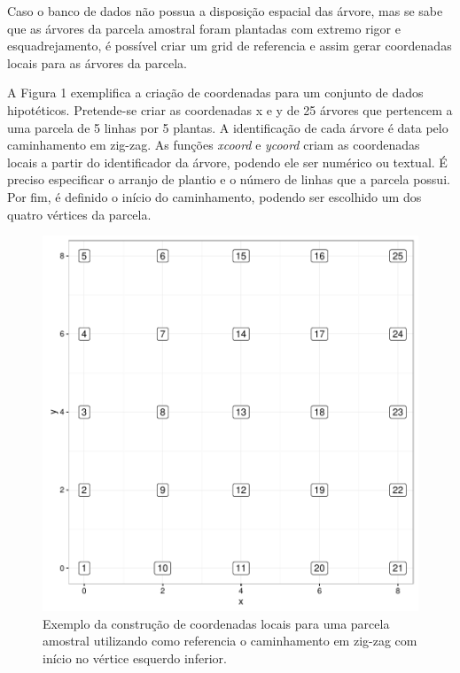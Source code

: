 \documentclass[article]{jss}
\begin{document}
Caso o banco de dados não possua a disposição espacial das árvore, mas
se sabe que as árvores da parcela amostral foram plantadas com extremo
rigor e esquadrejamento, é possível criar um grid de referencia e assim
gerar coordenadas locais para as árvores da parcela.

A Figura 1 exemplifica a criação de coordenadas para um conjunto de
dados hipotéticos. Pretende-se criar as coordenadas x e y de 25 árvores
que pertencem a uma parcela de 5 linhas por 5 plantas. A identificação
de cada árvore é data pelo caminhamento em zig-zag. As funções
\emph{xcoord} e \emph{ycoord} criam as coordenadas locais a partir do
identificador da árvore, podendo ele ser numérico ou textual. É preciso
especificar o arranjo de plantio e o número de linhas que a parcela
possui. Por fim, é definido o início do caminhamento, podendo ser
escolhido um dos quatro vértices da parcela.

\begin{CodeChunk}
\begin{figure}

{\centering \includegraphics{comp3-paper_files/figure-latex/ex_coord-1} 

}

\caption[Exemplo da construção de coordenadas locais para uma parcela amostral utilizando como referencia o caminhamento em zig-zag com início no vértice esquerdo inferior]{Exemplo da construção de coordenadas locais para uma parcela amostral utilizando como referencia o caminhamento em zig-zag com início no vértice esquerdo inferior.}\label{fig:ex_coord}
\end{figure}
\end{CodeChunk}
\end{document}
